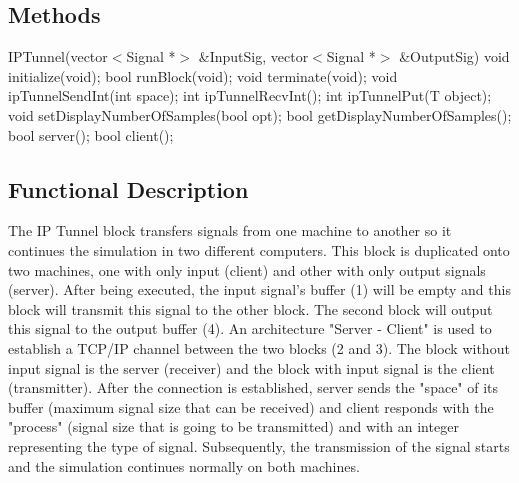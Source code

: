 %

\subsection*{Methods}
%
IPTunnel(vector$<$Signal *$>$ \&InputSig, vector$<$Signal *$>$ \&OutputSig)
\bigbreak
void initialize(void);
\bigbreak
bool runBlock(void);
\bigbreak
void terminate(void);
\bigbreak
void ipTunnelSendInt(int space);
\bigbreak
int ipTunnelRecvInt();
\bigbreak
int ipTunnelPut(T object);
\bigbreak
void setDisplayNumberOfSamples(bool opt);
\bigbreak
bool getDisplayNumberOfSamples();
\bigbreak
bool server();
\bigbreak
bool client();



\subsection*{Functional Description}

The IP Tunnel block transfers signals from one machine to another so it continues the simulation in two different computers. This block is duplicated onto two machines, one with only input (client) and other with only output signals (server). After being executed, the input signal's buffer (1) will be empty and this block will transmit this signal to the other block. The second block will output this signal to the output buffer (4). An architecture "Server - Client" is used to establish a TCP/IP channel between the two blocks (2 and 3). The block without input signal is the server (receiver) and the block with input signal is the client (transmitter). After the connection is established, server sends the "space" of its buffer (maximum signal size that can be received) and client responds with the "process" (signal size that is going to be transmitted) and with an integer representing the type of signal. Subsequently, the transmission of the signal starts and the simulation continues normally on both machines.

